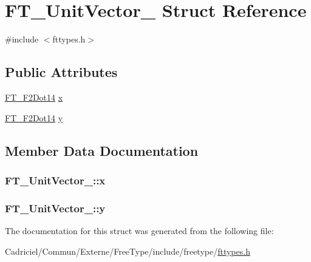 \hypertarget{struct_f_t___unit_vector__}{\section{F\-T\-\_\-\-Unit\-Vector\-\_\- Struct Reference}
\label{struct_f_t___unit_vector__}
}


{\ttfamily \#include $<$fttypes.\-h$>$}

\subsection*{Public Attributes}
\begin{DoxyCompactItemize}
\item 
\hyperlink{fttypes_8h_a430d070e946e531a607ae350e822ffca}{F\-T\-\_\-\-F2\-Dot14} \hyperlink{struct_f_t___unit_vector___a03c9f8ae35a5ad1bcac49995a9dac714}{x}
\item 
\hyperlink{fttypes_8h_a430d070e946e531a607ae350e822ffca}{F\-T\-\_\-\-F2\-Dot14} \hyperlink{struct_f_t___unit_vector___a12eb9ad5c47614f5f2d3f9e401933d0e}{y}
\end{DoxyCompactItemize}


\subsection{Member Data Documentation}
\hypertarget{struct_f_t___unit_vector___a03c9f8ae35a5ad1bcac49995a9dac714}{
\subsubsection[{x}]{ F\-T\-\_\-\-Unit\-Vector\-\_\-\-::x}}\label{struct_f_t___unit_vector___a03c9f8ae35a5ad1bcac49995a9dac714}
\hypertarget{struct_f_t___unit_vector___a12eb9ad5c47614f5f2d3f9e401933d0e}{
\subsubsection[{y}]{ F\-T\-\_\-\-Unit\-Vector\-\_\-\-::y}}\label{struct_f_t___unit_vector___a12eb9ad5c47614f5f2d3f9e401933d0e}


The documentation for this struct was generated from the following file\-:\begin{DoxyCompactItemize}
\item 
Cadriciel/\-Commun/\-Externe/\-Free\-Type/include/freetype/\hyperlink{fttypes_8h}{fttypes.\-h}\end{DoxyCompactItemize}
